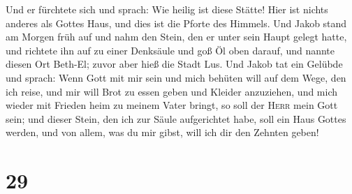  Und er fürchtete sich und sprach: Wie heilig ist diese
Stätte! Hier ist nichts anderes als Gottes Haus, und dies ist die Pforte
des Himmels.  Und Jakob stand am Morgen früh auf und nahm
den Stein, den er unter sein Haupt gelegt hatte, und richtete ihn auf zu
einer Denksäule und goß Öl oben darauf,  und nannte
diesen Ort Beth-El; zuvor aber hieß die Stadt Lus.  Und
Jakob tat ein Gelübde und sprach: Wenn Gott mit mir sein und mich
behüten will auf dem Wege, den ich reise, und mir will Brot zu essen
geben und Kleider anzuziehen,  und mich wieder mit
Frieden heim zu meinem Vater bringt, so soll der \textsc{Herr} mein Gott
sein;  und dieser Stein, den ich zur Säule aufgerichtet
habe, soll ein Haus Gottes werden, und von allem, was du mir gibst, will
ich dir den Zehnten geben!

\hypertarget{section-28}{%
\section{29}\label{section-28}}

